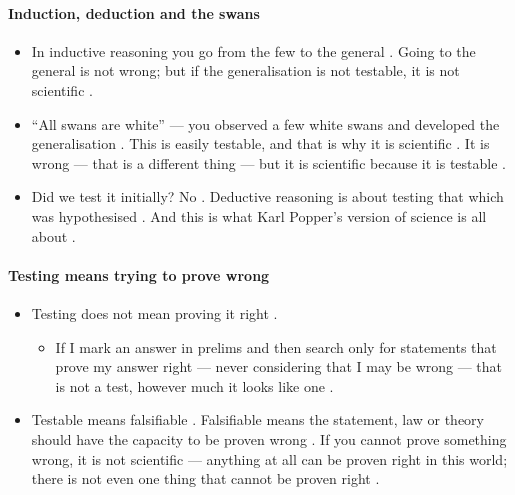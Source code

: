 \paragraph{Induction, deduction and the swans}
\begin{itemize}
    \item In inductive reasoning you go from the few to the general . Going to the general is not wrong; but if the generalisation is not testable, it is not scientific .
    \item ``All swans are white'' --- you observed a few white swans and developed the generalisation . This is easily testable, and that is why it is scientific . It is wrong --- that is a different thing --- but it is scientific because it is testable .
    \item Did we test it initially? No . Deductive reasoning is about testing that which was hypothesised . And this is what Karl Popper's version of science is all about .
\end{itemize}

\paragraph{Testing means trying to prove wrong}
\begin{itemize}
    \item Testing does not mean proving it right .
    \begin{itemize}
        \item If I mark an answer in prelims and then search only for statements that prove my answer right --- never considering that I may be wrong --- that is not a test, however much it looks like one .
    \end{itemize}
    \item Testable means falsifiable . Falsifiable means the statement, law or theory should have the capacity to be proven wrong . If you cannot prove something wrong, it is not scientific --- anything at all can be proven right in this world; there is not even one thing that cannot be proven right .
\end{itemize}

